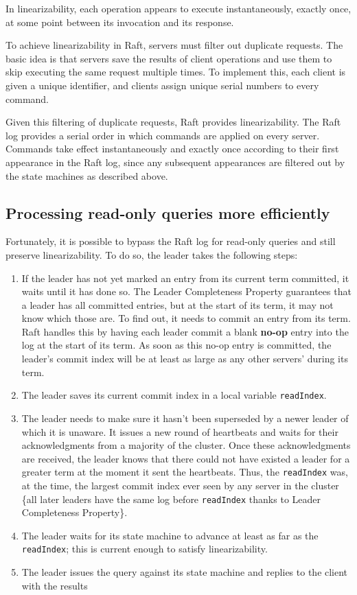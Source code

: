 \documentclass[11pt]{article}
\begin{document}
In linearizability, each operation appears to execute instantaneously, exactly once, at some point
between its invocation and its response.

To achieve linearizability in Raft, servers must filter out duplicate requests. The basic idea is that
servers save the results of client operations and use them to skip executing the same request multiple
times. To implement this, each client is given a unique identifier, and clients assign unique serial
numbers to every command.

Given this filtering of duplicate requests, Raft provides linearizability. The Raft log provides a
serial order in which commands are applied on every server. Commands take effect instantaneously and
exactly once according to their first appearance in the Raft log, since any subsequent appearances are
filtered out by the state machines as described above.
\subsection{Processing read-only queries more efficiently}
\label{sec:orgb616181}
Fortunately, it is possible to bypass the Raft log for read-only queries and still preserve
linearizability. To do so, the leader takes the following steps:
\begin{enumerate}
\item If the leader has not yet marked an entry from its current term committed, it waits until it has
done so. The Leader Completeness Property guarantees that a leader has all committed entries, but
at the start of its term, it may not know which those are. To find out, it needs to commit an entry
from its term. Raft handles this by having each leader commit a blank \textbf{no-op} entry into the log at
the start of its term. As soon as this no-op entry is committed, the leader's commit index will be at least as large as any other servers' during its term.
\item The leader saves its current commit index in a local variable \texttt{readIndex}.
\item The leader needs to make sure it hasn’t been superseded by a newer leader of which it is unaware.
It issues a new round of heartbeats and waits for their acknowledgments from a majority of the
cluster. Once these acknowledgments are received, the leader knows that there could not have
existed a leader for a greater term at the moment it sent the heartbeats. Thus, the \texttt{readIndex} was,
at the time, the largest commit index ever seen by any server in the cluster \wu\{all later leaders
have the same log before \texttt{readIndex} thanks to Leader Completeness Property\}.
\item The leader waits for its state machine to advance at least as far as the \texttt{readIndex}; this is current enough to satisfy linearizability.
\item The leader issues the query against its state machine and replies to the client with the results
\end{enumerate}
\end{document}
